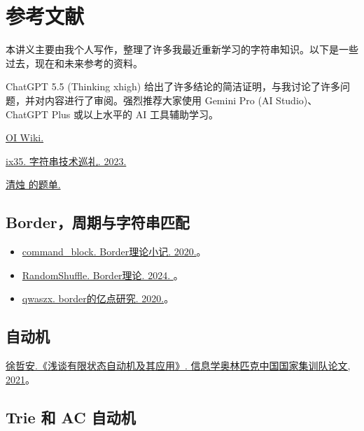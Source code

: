 \chapter*{参考文献}


    本讲义主要由我个人写作，整理了许多我最近重新学习的字符串知识。以下是一些过去，现在和未来参考的资料。

    ChatGPT 5.5 (Thinking xhigh) 给出了许多结论的简洁证明，与我讨论了许多问题，并对内容进行了审阅。强烈推荐大家使用 Gemini Pro (AI Studio)、ChatGPT Plus 或以上水平的 AI 工具辅助学习。

    \href{http://oiwiki.com}{OI Wiki.}

    \href{https://www.luogu.com/article/xz8mjesh}{ix35. 字符串技术巡礼. 2023.}

    \href{https://www.luogu.com.cn/training/53971}{清烛 的题单.}

\section{Border，周期与字符串匹配}

\begin{itemize}
    \item \href{https://www.luogu.com.cn/article/ds5cz0sg}{command\_block. Border理论小记. 2020.}。
    \item \href{https://www.cnblogs.com/EmilyDavid/p/18631325}{RandomShuffle. Border理论. 2024. }。
    \item \href{https://www.luogu.com.cn/article/crd8c9r9}{qwaszx. border的亿点研究. 2020.}。
\end{itemize}

\section{自动机}

\href{https://github.com/OIerTFX/IOI/blob/master/%E5%9B%BD%E5%AE%B6%E9%9B%86%E8%AE%AD%E9%98%9F2021%E8%AE%BA%E6%96%87%E9%9B%86/pdf-files/%E5%BE%90%E5%93%B2%E5%AE%89%20%E6%B5%85%E8%B0%88%E6%9C%89%E9%99%90%E7%8A%B6%E6%80%81%E8%87%AA%E5%8A%A8%E6%9C%BA%E5%8F%8A%E5%85%B6%E5%BA%94%E7%94%A8.pdf}{徐哲安.《浅谈有限状态自动机及其应用》. 信息学奥林匹克中国国家集训队论文, 2021}。

\section{Trie 和 AC 自动机}

